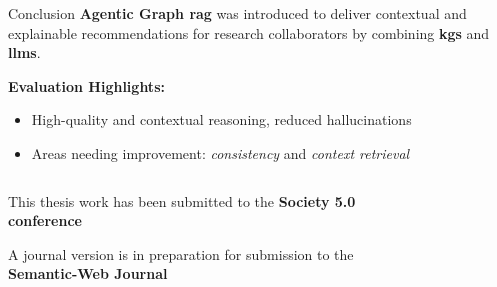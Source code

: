 \begin{tframe}{Conclusion}
    \textbf{Agentic Graph \gls{rag}} was introduced to deliver contextual and explainable recommendations for research collaborators by combining \textbf{\glspl{kg}} and \textbf{\glspl{llm}}.
    
    \vspace{0.5em}
    \textbf{Evaluation Highlights:}
    \begin{itemize}
      \item High-quality and contextual reasoning, reduced hallucinations
      \item Areas needing improvement: \textit{consistency} and \textit{context retrieval}
    \end{itemize}
    
    \begin{columns}
      \begin{column}{0.52\textwidth}
        \begin{itemize}
          {\scriptsize
          \item This thesis work has been submitted to the \textbf{Society 5.0 conference}%
          \item A journal version is in preparation for submission to the \textbf{Semantic-Web Journal}%
          }
        \end{itemize}


      \end{column}
      \begin{column}{0.4\textwidth}
        \begin{figure}[htbp]
          \centering
      \end{figure}
      \end{column}
  \end{columns}
\end{tframe}